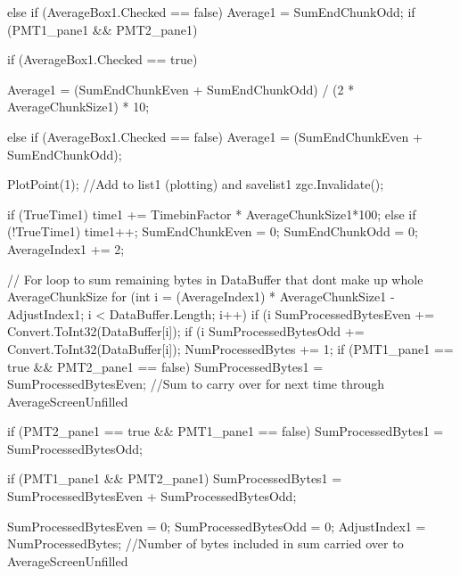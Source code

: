 {{{{{{                    }
                    else if (AverageBox1.Checked == false)
                    {
                        Average1 = SumEndChunkOdd;
                    }
                }
                if (PMT1_pane1 && PMT2_pane1)
                {
                    if (AverageBox1.Checked == true)
                    {
                        Average1 = (SumEndChunkEven + SumEndChunkOdd) / (2 * AverageChunkSize1) * 10;

                    }
                    else if (AverageBox1.Checked == false)
                    {
                        Average1 = (SumEndChunkEven + SumEndChunkOdd);
                    }

                }

                PlotPoint(1); //Add to list1 (plotting) and savelist1
                zgc.Invalidate();

                if (TrueTime1)
                {
                    time1 += TimebinFactor * AverageChunkSize1*100;
                }
                else if (!TrueTime1)
                {
                    time1++;
                }
                SumEndChunkEven = 0;
                SumEndChunkOdd = 0;
                AverageIndex1 += 2;
            }

            // For loop to sum remaining bytes in DataBuffer that dont make up whole AverageChunkSize
            for (int i = (AverageIndex1) * AverageChunkSize1 - AdjustIndex1; i < DataBuffer.Length; i++)
            {
                if (i %
                {
                    SumProcessedBytesEven += Convert.ToInt32(DataBuffer[i]);
                }
                if (i %
                {
                    SumProcessedBytesOdd += Convert.ToInt32(DataBuffer[i]);
                }
                NumProcessedBytes += 1;
            }
            if (PMT1_pane1 == true && PMT2_pane1 == false)
            {
                SumProcessedBytes1 = SumProcessedBytesEven; //Sum to carry over for next time through AverageScreenUnfilled
            }

            if (PMT2_pane1 == true && PMT1_pane1 == false)
            {
                SumProcessedBytes1 = SumProcessedBytesOdd;
            }

            if (PMT1_pane1 && PMT2_pane1)
            {
                SumProcessedBytes1 = SumProcessedBytesEven + SumProcessedBytesOdd;
            }

            SumProcessedBytesEven = 0;
            SumProcessedBytesOdd = 0;
            AdjustIndex1 = NumProcessedBytes; //Number of bytes included in sum carried over to AverageScreenUnfilled

}}}
